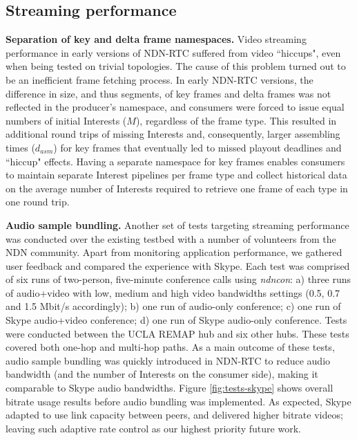 \documentclass{icn/sig-alternate-2013} %
\newcommand{\ndnrtcName}{NDN-RTC} %
\newcommand{\ndnconName}{\emph{ndncon}}
\begin{document}
\subsection{Streaming performance}

\textbf{Separation of key and delta frame namespaces.} Video streaming performance in early versions of \ndnrtcName{} suffered from video ``hiccups", even when being tested on trivial topologies. The cause of this problem turned out to be an inefficient frame fetching process. In early \ndnrtcName{} versions, the difference in size, and thus segments, of key frames and delta frames was not reflected in the producer's namespace, and consumers were forced to issue equal numbers of initial Interests ($M$), regardless of the frame type. This resulted in additional round trips of missing Interests and, consequently, larger assembling times ($d_{asm}$) for key frames that eventually led to missed playout deadlines and ``hiccup" effects. Having a separate namespace for key frames enables consumers to maintain separate Interest pipelines per frame type and collect historical data on the average number of Interests required to retrieve one frame of each type in one round trip. 

\textbf{Audio sample bundling.}
Another set of tests targeting streaming performance was conducted over the existing testbed with a number of volunteers from the NDN community. Apart from monitoring application performance, we gathered user feedback and compared the experience with Skype. 
Each test was comprised of six runs of two-person, five-minute conference calls using \ndnconName{}: a) three runs of audio+video with low, medium and high video bandwidths settings (0.5, 0.7 and 1.5 Mbit/s accordingly); b) one run of audio-only conference; c) one run of Skype audio+video conference; d) one run of Skype audio-only conference. Tests were conducted between the UCLA REMAP hub and six other hubs. These tests covered both one-hop and multi-hop paths. 
As a main outcome of these tests, audio sample bundling was quickly introduced in \ndnrtcName{} to reduce audio bandwidth (and the number of Interests on the consumer side), making it comparable to Skype audio bandwidths. Figure \ref{fig:tests-skype} shows overall bitrate usage results before audio bundling was implemented. As expected, Skype adapted to use link capacity between peers, and delivered higher bitrate videos; leaving such adaptive rate control as our highest priority future work. %
\end{document}
